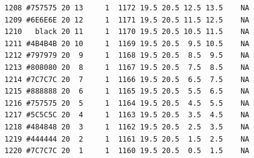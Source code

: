 \documentclass[12pt,twoside]{reedthesis}
\begin{document}
\begin{verbatim}
  1208 #757575 20 13     1  1172 19.5 20.5 12.5 13.5    NA
  1209 #6E6E6E 20 12     1  1171 19.5 20.5 11.5 12.5    NA
  1210   black 20 11     1  1170 19.5 20.5 10.5 11.5    NA
  1211 #4B4B4B 20 10     1  1169 19.5 20.5  9.5 10.5    NA
  1212 #797979 20  9     1  1168 19.5 20.5  8.5  9.5    NA
  1213 #808080 20  8     1  1167 19.5 20.5  7.5  8.5    NA
  1214 #7C7C7C 20  7     1  1166 19.5 20.5  6.5  7.5    NA
  1215 #888888 20  6     1  1165 19.5 20.5  5.5  6.5    NA
  1216 #757575 20  5     1  1164 19.5 20.5  4.5  5.5    NA
  1217 #5C5C5C 20  4     1  1163 19.5 20.5  3.5  4.5    NA
  1218 #484848 20  3     1  1162 19.5 20.5  2.5  3.5    NA
  1219 #444444 20  2     1  1161 19.5 20.5  1.5  2.5    NA
  1220 #7C7C7C 20  1     1  1160 19.5 20.5  0.5  1.5    NA
  \end{verbatim}
  
  \begin{Shaded}
  \begin{Highlighting}[]
  \NormalTok{(g$data[[}\NormalTok{]], }\NormalTok{)}
  
  
  
  \NormalTok{(}\StringTok{ }\NormalTok{(} \NormalTok{, } \NormalTok{,} \NormalTok{(}\NormalTok{))+}\StringTok{ }\NormalTok{(}\NormalTok{(}\NormalTok{()+}\NormalTok{(} \NormalTok{(} \NormalTok{, } \NormalTok{), } \NormalTok{(} \NormalTok{), } \NormalTok{(}\NormalTok{), }\NormalTok{(} \NormalTok{,} \NormalTok{))+}\StringTok{ }\NormalTok{(} \NormalTok{(}\NormalTok{),} \NormalTok{)}
  \NormalTok{(}\NormalTok{, }  \NormalTok{, } \NormalTok{)}
  
  \StringTok{ }
  \NormalTok{gcolor$data[[}\NormalTok{]][}\NormalTok{]}
  \end{Highlighting}
  \end{Shaded}
  
\end{document}
